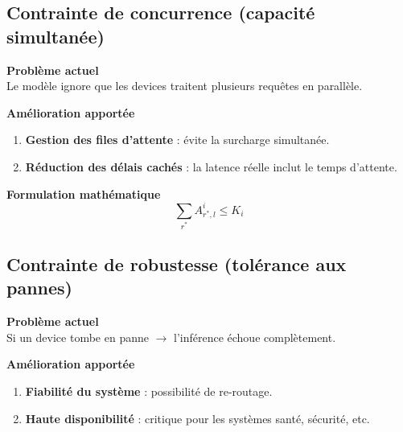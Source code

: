 \documentclass[a4paper,11pt]{article}
\begin{document}
\subsection{Contrainte de concurrence (capacité simultanée)}
\textbf{Problème actuel}\\
Le modèle ignore que les devices traitent plusieurs requêtes en parallèle.

\textbf{Amélioration apportée}
\begin{enumerate}[label=\alph*)]
\item \textbf{Gestion des files d’attente} : évite la surcharge simultanée.
\item \textbf{Réduction des délais cachés} : la latence réelle inclut le temps d’attente.
\end{enumerate}

\textbf{Formulation mathématique}
\[
\sum_{r^*} A^i_{r^*,l} \le K_i
\]

\subsection{Contrainte de robustesse (tolérance aux pannes)}
\textbf{Problème actuel}\\
Si un device tombe en panne $\rightarrow$ l’inférence échoue complètement.

\textbf{Amélioration apportée}
\begin{enumerate}[label=\alph*)]
\item \textbf{Fiabilité du système} : possibilité de re-routage.
\item \textbf{Haute disponibilité} : critique pour les systèmes santé, sécurité, etc.
\end{enumerate}
\end{document}
